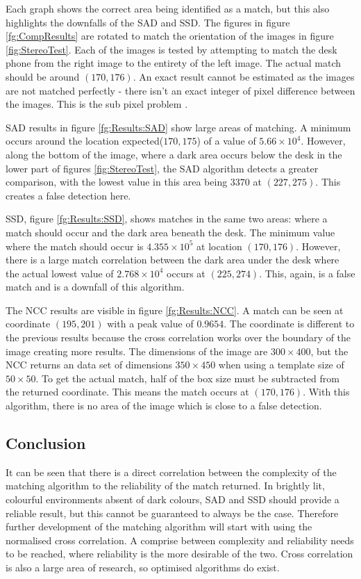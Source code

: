 Each graph shows the correct area being identified as a match, but this also highlights the downfalls of the SAD and SSD. The figures in figure \ref{fg:CompResults} are rotated to match the orientation of the images in figure \ref{fig:StereoTest}. Each of the images is tested by attempting to match the desk phone from the right image to the entirety of the left image. The actual match should be around $(170, 176)$. An exact result cannot be estimated as the images are not matched perfectly - there isn't an exact integer of pixel difference between the images. This is the sub pixel problem \citep{haller2012design}.

SAD results in figure \ref{fg:Results:SAD} show large areas of matching. A minimum occurs around the location expected($170,175$) of a value of $5.66\times 10^4$. However, along the bottom of the image, where a dark area occurs below the desk in the lower part of figures \ref{fig:StereoTest}, the SAD algorithm detects a greater comparison, with the lowest value in this area being $3370$ at $(227, 275)$. This creates a false detection here. 

SSD, figure \ref{fg:Results:SSD}, shows matches in the same two areas: where a match should occur and the dark area beneath the desk. The minimum value where the match should occur is $4.355 \times 10^5$ at location $(170,176)$. However, there is a large match correlation between the dark area under the desk where the actual lowest value of $2.768\times10^4$ occurs at $(225,274)$. This, again, is a false match and is a downfall of this algorithm. 

The NCC results are visible in figure \ref{fg:Results:NCC}. A match can be seen at coordinate $(195,201)$ with a peak value of $0.9654$. The coordinate is different to the previous results because the cross correlation works over the boundary of the image creating more results. The dimensions of the image are $300 \times 400$, but the NCC returns an data set of dimensions $350 \times 450$ when using a template size of $50\times 50$. To get the actual match, half of the box size must be subtracted from the returned coordinate. This means the match occurs at $(170,176)$. With this algorithm, there is no area of the image which is close to a false detection. 

\subsection{Conclusion}
It can be seen that there is a direct correlation between the complexity of the matching algorithm to the reliability of the match returned. In brightly lit, colourful environments absent of dark colours, SAD and SSD should provide a reliable result, but this cannot be guaranteed to always be the case. Therefore further development of the matching algorithm will start with using the normalised cross correlation. A comprise between complexity and reliability needs to be reached, where reliability is the more desirable of the two. Cross correlation is also a large area of research, so optimised algorithms do exist.


